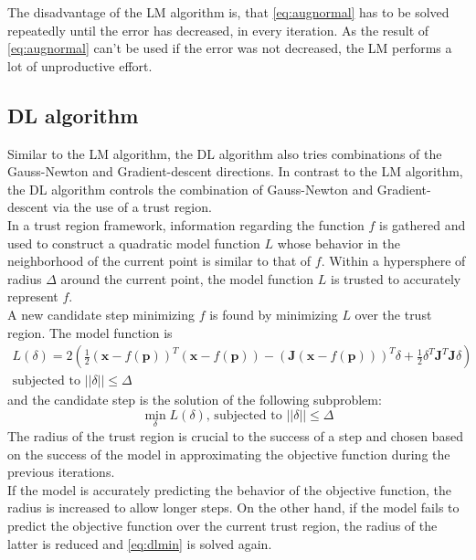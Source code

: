 The disadvantage of the \ac{LM} algorithm is, that \autoref{eq:augnormal} has to be solved repeatedly until the error has decreased, in every iteration. As the result of \autoref{eq:augnormal} can't be used if the error was not decreased, the \ac{LM} performs a lot of unproductive effort.

\subsection{\acf{DL} algorithm}
Similar to the \ac{LM} algorithm, the \ac{DL} algorithm also tries combinations of the Gauss-Newton and Gradient-descent directions. In contrast to the \ac{LM} algorithm, the \ac{DL} algorithm controls the combination of Gauss-Newton and Gradient-descent via the use of a trust region.\\

In a trust region framework, information regarding the function $f$ is gathered and used to construct a quadratic model function $L$ whose behavior in the neighborhood of the current point is similar to that of $f$. Within a hypersphere of radius $\Delta$ around the current point, the model function $L$ is trusted to accurately represent $f$.\\

A new candidate step minimizing $f$ is found by minimizing $L$ over the trust region. The model function is
\begin{align}
  L(\delta) = 2(\frac{1}{2} (\mathbf{x} - f(\mathbf{p}))^T(\mathbf{x} - f(\mathbf{p})) - (\mathbf{J}(\mathbf{x} - f(\mathbf{p})))^T \delta + \frac{1}{2} \delta^T \mathbf{J}^T \mathbf{J} \delta)\\
  \text{subjected to } ||\delta|| \le \Delta \nonumber
\end{align}
and the candidate step is the solution of the following subproblem:
\begin{equation} 
  \min_\delta L(\delta) \text{, subjected to } ||\delta|| \le \Delta
  \label{eq:dlmin}
\end{equation}
The radius of the trust region is crucial to the success of a step and chosen based on the success of the model in approximating the objective function during the previous iterations.\\
If the model is accurately predicting the behavior of the objective function, the radius is increased to allow longer steps. On the other hand, if the model fails to predict the objective function over the current trust region, the radius of the latter is reduced and \autoref{eq:dlmin} is solved again.

